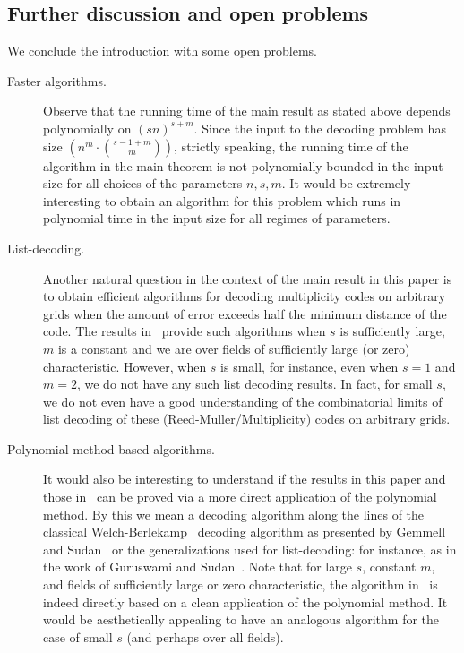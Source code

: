 \documentclass{article}
\begin{document}
	\subsection{Further discussion and open problems}
	We conclude the introduction with some open problems.
	\begin{description}
		\item [Faster algorithms.] Observe that the running time of the main result  as stated above depends polynomially on $(sn)^{s+m}$. Since the input to the decoding problem has size $\left(n^m\cdot \binom{s - 1 + m}{m} \right)$, strictly speaking, the running time of the algorithm in the main theorem is not polynomially bounded in the input size for all choices of the parameters $n, s, m$. It would be extremely interesting to obtain an algorithm for this problem which runs in polynomial time in the input size for all regimes of parameters. 
		
		\item[List-decoding. ] Another natural question in the context of the main result in this paper is to obtain efficient algorithms for decoding multiplicity codes on arbitrary grids when the amount of error exceeds half the minimum distance of the code. The results in~\cite{BhandariHKS2021-mgrid} provide such algorithms when $s$ is sufficiently large, $m$ is a constant and we are over fields of sufficiently large (or zero) characteristic. However, when $s$ is small, for instance, even when $s= 1$ and $m=2$, we do not have any such list decoding results. In fact, for small $s$, we do not even have a good understanding of the combinatorial limits of list decoding of these (Reed-Muller/Multiplicity) codes on arbitrary grids. 
		
		
		\item[Polynomial-method-based algorithms. ] It would also be interesting to understand if the results in this paper and those in~\cite{KimK2017} can be proved via a more direct application of the polynomial method. By this we mean a decoding algorithm along the lines of the classical Welch-Berlekamp~\cite{WelchB1986} decoding algorithm as presented by Gemmell and Sudan~\cite{GemmellS1992} or the generalizations used for list-decoding: for instance, as in the work of Guruswami and Sudan~\cite{GuruswamiS1999}.
		Note that for large $s$, constant $m$, and fields of sufficiently large or zero characteristic, the algorithm in~\cite{BhandariHKS2021-mgrid} is indeed directly based on a clean application of the polynomial method. It would be aesthetically appealing to have an analogous algorithm for the case of small $s$ (and perhaps over all fields).
	\end{description}
	
\end{document}
